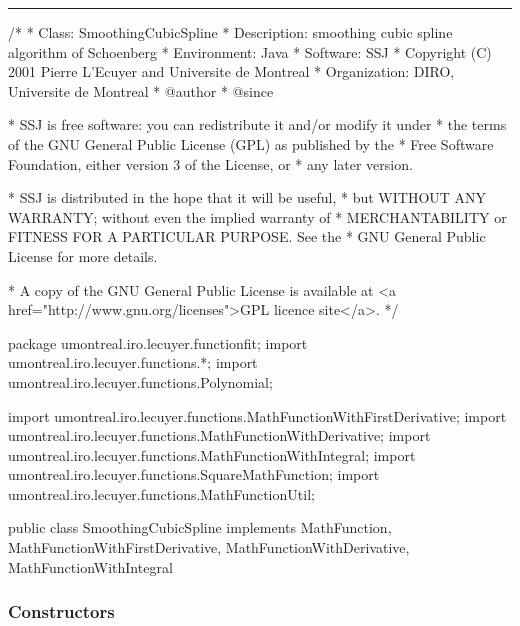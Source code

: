 \bigskip\hrule

\begin{code}
\begin{hide}
/*
 * Class:        SmoothingCubicSpline
 * Description:  smoothing cubic spline algorithm of Schoenberg
 * Environment:  Java
 * Software:     SSJ 
 * Copyright (C) 2001  Pierre L'Ecuyer and Universite de Montreal
 * Organization: DIRO, Universite de Montreal
 * @author       
 * @since

 * SSJ is free software: you can redistribute it and/or modify it under
 * the terms of the GNU General Public License (GPL) as published by the
 * Free Software Foundation, either version 3 of the License, or
 * any later version.

 * SSJ is distributed in the hope that it will be useful,
 * but WITHOUT ANY WARRANTY; without even the implied warranty of
 * MERCHANTABILITY or FITNESS FOR A PARTICULAR PURPOSE.  See the
 * GNU General Public License for more details.

 * A copy of the GNU General Public License is available at
   <a href="http://www.gnu.org/licenses">GPL licence site</a>.
 */
\end{hide}
package umontreal.iro.lecuyer.functionfit;
   import umontreal.iro.lecuyer.functions.*;
   import umontreal.iro.lecuyer.functions.Polynomial;\begin{hide}
import umontreal.iro.lecuyer.functions.MathFunctionWithFirstDerivative;
import umontreal.iro.lecuyer.functions.MathFunctionWithDerivative;
import umontreal.iro.lecuyer.functions.MathFunctionWithIntegral;
import umontreal.iro.lecuyer.functions.SquareMathFunction;
import umontreal.iro.lecuyer.functions.MathFunctionUtil;
\end{hide}

public class SmoothingCubicSpline implements MathFunction,
             MathFunctionWithFirstDerivative, MathFunctionWithDerivative,
             MathFunctionWithIntegral\begin{hide} {

   private Polynomial[] splineVector;
   private double[] x, y, weight;
   private double rho;
\end{hide}
\end{code}
\subsubsection* {Constructors}

